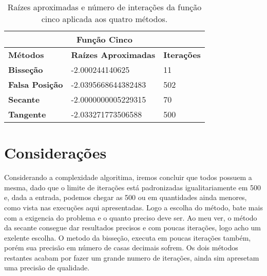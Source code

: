 \documentclass[12pt]{article}
\begin{document}
\begin{table}[!h]
\begin{center}
\begin{tabular}{lll}
\multicolumn{3}{c}{\textbf{Função Cinco}}                                                                           \\ \hline
\multicolumn{1}{l|}{\textbf{Métodos}}       & \multicolumn{1}{l|}{\textbf{Raízes Aproximadas}} & \textbf{Iterações} \\ \hline
\multicolumn{1}{l|}{\textbf{Bisseção}}      & \multicolumn{1}{l|}{-2.000244140625}             & 11                 \\ \hline
\multicolumn{1}{l|}{\textbf{Falsa Posição}} & \multicolumn{1}{l|}{-2.0395668644382483}         & 502                \\ \hline
\multicolumn{1}{l|}{\textbf{Secante}}       & \multicolumn{1}{l|}{-2.0000000005229315}         & 70                 \\ \hline
\multicolumn{1}{l|}{\textbf{Tangente}}      & \multicolumn{1}{l|}{-2.033271773506588}          & 500               
\end{tabular}
    \caption{Raízes aproximadas e número de interações da função cinco aplicada aos quatro métodos.}
\end{center}
\end{table}

\section{Considerações}

Considerando a complexidade algoritima, iremos concluir que todos possuem a mesma, dado que o limite de iterações está padronizadas igualitariamente em 500 e, dada a entrada, podemos chegar as 500 ou em quantidades ainda menores, como vista nas execuções aqui apresentadas. Logo a escolha do método, bate mais com a exigencia do problema e o quanto preciso deve ser. Ao meu ver, o método da secante consegue dar resultados precisos e com poucas iterações, logo acho um exelente escolha. O metodo da bisseção, executa em poucas iterações também, porém sua precisão em número de casas decimais sofrem. Os dois métodos restantes acabam por fazer um grande numero de iterações, ainda sim apresetam uma precisão de qualidade. 
\end{document}
